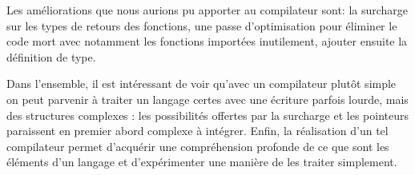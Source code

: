 \documentclass[11pt,a4paper]{article}
\begin{document}
Les améliorations que nous aurions pu apporter au compilateur sont: la surcharge sur les types de retours des fonctions, une passe d'optimisation pour éliminer le code mort avec notamment les fonctions importées inutilement, ajouter ensuite la définition de type.

Dans l'ensemble, il est intéressant de voir qu'avec un compilateur plutôt simple on peut parvenir à traiter un langage certes avec une écriture parfois lourde, mais des structures complexes : les possibilités offertes par la surcharge et les pointeurs paraissent en premier abord complexe à intégrer. Enfin, la réalisation d'un tel compilateur permet d'acquérir une compréhension profonde de ce que sont les éléments d'un langage et d'expérimenter une manière de les traiter simplement.
\end{document}
